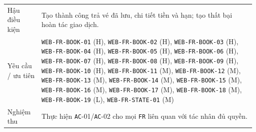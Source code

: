 \begin{longtable}{@{}P{0.20000\SRSWidth}P{0.80000\SRSWidth}@{}}
Hậu điều kiện & Tạo thành công trả vé đã lưu, chi tiết tiền và hạn; tạo thất bại hoàn tác giao dịch. \\[3pt]
Yêu cầu /\allowbreak{} ưu tiên & \texttt{WEB-\allowbreak{}FR-\allowbreak{}BOOK-\allowbreak{}01} (H), \texttt{WEB-\allowbreak{}FR-\allowbreak{}BOOK-\allowbreak{}02} (H), \texttt{WEB-\allowbreak{}FR-\allowbreak{}BOOK-\allowbreak{}03} (H), \texttt{WEB-\allowbreak{}FR-\allowbreak{}BOOK-\allowbreak{}04} (H), \texttt{WEB-\allowbreak{}FR-\allowbreak{}BOOK-\allowbreak{}05} (H), \texttt{WEB-\allowbreak{}FR-\allowbreak{}BOOK-\allowbreak{}06} (H), \texttt{WEB-\allowbreak{}FR-\allowbreak{}BOOK-\allowbreak{}07} (H), \texttt{WEB-\allowbreak{}FR-\allowbreak{}BOOK-\allowbreak{}08} (H), \texttt{WEB-\allowbreak{}FR-\allowbreak{}BOOK-\allowbreak{}09} (H), \texttt{WEB-\allowbreak{}FR-\allowbreak{}BOOK-\allowbreak{}10} (H), \texttt{WEB-\allowbreak{}FR-\allowbreak{}BOOK-\allowbreak{}11} (M), \texttt{WEB-\allowbreak{}FR-\allowbreak{}BOOK-\allowbreak{}12} (M), \texttt{WEB-\allowbreak{}FR-\allowbreak{}BOOK-\allowbreak{}13} (M), \texttt{WEB-\allowbreak{}FR-\allowbreak{}BOOK-\allowbreak{}14} (M), \texttt{WEB-\allowbreak{}FR-\allowbreak{}BOOK-\allowbreak{}15} (M), \texttt{WEB-\allowbreak{}FR-\allowbreak{}BOOK-\allowbreak{}16} (M), \texttt{WEB-\allowbreak{}FR-\allowbreak{}BOOK-\allowbreak{}17} (M), \texttt{WEB-\allowbreak{}FR-\allowbreak{}BOOK-\allowbreak{}18} (M), \texttt{WEB-\allowbreak{}FR-\allowbreak{}BOOK-\allowbreak{}19} (L), \texttt{WEB-\allowbreak{}FR-\allowbreak{}STATE-\allowbreak{}01} (M) \\[3pt]
Nghiệm thu & Thực hiện \texttt{AC}-01/\allowbreak{}\texttt{AC}-02 cho mọi \texttt{FR} liên quan với tác nhân đủ quyền. \\[3pt]
\end{longtable}
\endgroup

